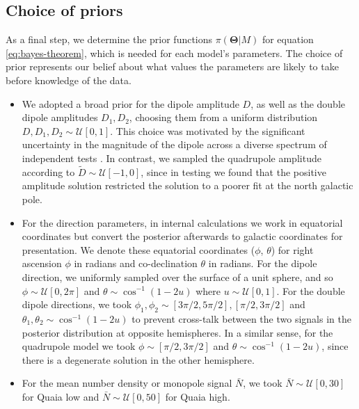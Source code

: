 \documentclass[fleqn,usenatbib]{mnras}
\begin{document}
    \subsection{Choice of priors}
        As a final step, we determine the prior functions $\pi (\mathbf{\Theta} | M)$ for equation \eqref{eq:bayes-theorem}, which is needed for each model's parameters.
        The choice of prior represents our belief about what values the parameters are likely to take before knowledge of the data.
        \begin{itemize}
            \item We adopted a broad prior for the dipole amplitude $D$, as well as the double dipole amplitudes $D_1, D_2$, choosing them from a uniform distribution $D, D_1, D_2 \sim \mathcal{U}[0, 1]$.
            This choice was motivated by the significant uncertainty in the magnitude of the dipole across a diverse spectrum of independent tests \citep[see e.g.][]{snowmass2022, aluri2023}.
            In contrast, we sampled the quadrupole amplitude according to $\tilde{D} \sim \mathcal{U}[-1,0]$, since in testing we found that the positive amplitude solution restricted the solution to a poorer fit at the north galactic pole.
            \item For the direction parameters, in internal calculations we work in equatorial coordinates but convert the posterior afterwards to galactic coordinates for presentation.
            We denote these equatorial coordinates ($\phi$, $\theta$) for right ascension $\phi$ in radians and co-declination $\theta$ in radians.
            For the dipole direction, we uniformly sampled over the surface of a unit sphere, and so $\phi \sim \mathcal{U}[0, 2\pi]$ and $\theta \sim \cos^{-1} (1 - 2 u)$ where $u \sim \mathcal{U}[0,1]$.
            For the double dipole directions, we took $\phi_1, \phi_2 \sim [3 \pi /2, 5 \pi /2], [\pi / 2, 3 \pi / 2]$ and $\theta_1, \theta_2 \sim \cos^{-1} (1 - 2u)$ to prevent cross-talk between the two signals in the posterior distribution at opposite hemispheres.
            In a similar sense, for the quadrupole model we took $\phi \sim [\pi / 2, 3 \pi / 2]$ and $\theta \sim \cos^{-1} (1 - 2u)$, since there is a degenerate solution in the other hemisphere.
            \item For the mean number density or monopole signal $\bar{N}$, we took $\bar{N} \sim \mathcal{U}[0,30]$ for Quaia low and $\bar{N} \sim \mathcal{U}[0,50]$ for Quaia high.
        \end{itemize}
    
\end{document}
